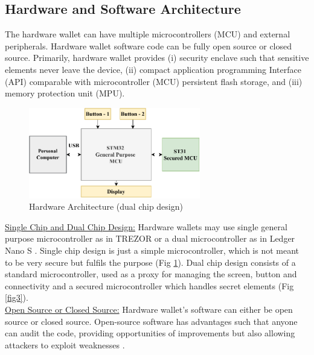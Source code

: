 \documentclass[conference]{IEEEtran}
\begin{document}
\subsection{Hardware and Software Architecture}
The hardware wallet can have multiple microcontrollers (MCU) and external peripherals. Hardware wallet software code can be fully open source or 
closed source. Primarily, hardware wallet provides (i) security enclave such that sensitive elements never leave the device, (ii) compact 
application programming Interface (API) comparable with microcontroller (MCU) persistent flash storage, and (iii) memory protection unit (MPU).\\     
\begin{figure}[t]
    \centering
    \includegraphics[width=75mm]{Figures/dualMCU.pdf}
    \caption{Hardware Architecture (dual chip design)}
    \label{fig2}
\end{figure}
\underline{Single Chip and Dual Chip Design:} Hardware wallets may use single general purpose microcontroller as in TREZOR \cite{arapinis2019formal} 
or a dual microcontroller as in Ledger Nano S \cite{suratkar2020cryptocurrency}. Single chip design is just a simple microcontroller, which is not 
meant to be very secure but fulfils the purpose (Fig \ref{fig2}). Dual chip design consists of a standard microcontroller, used as a proxy for 
managing the screen, button and connectivity and a secured microcontroller which handles secret elements (Fig \ref{fig3}). \\ 
\underline{Open Source or Closed Source:} Hardware wallet's software can either be open source or closed source. Open-source software has advantages 
such that anyone can audit the code, providing opportunities of improvements but also allowing attackers to exploit weaknesses \cite{san2019side}.

\end{document}
